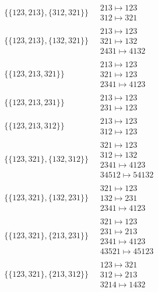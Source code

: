 \begin{scriptsize}
\begin{align}
\{\{123, 213\}, \{312, 321\}\}
\ 
&
\begin{matrix}
213 \mapsto 123\\312 \mapsto 321
\end{matrix}
\\
\{\{123, 213\}, \{132, 321\}\}
\ 
&
\begin{matrix}
213 \mapsto 123\\321 \mapsto 132\\2431 \mapsto 4132
\end{matrix}
\\
\{\{123, 213, 321\}\}
\ 
&
\begin{matrix}
213 \mapsto 123\\321 \mapsto 123\\2341 \mapsto 4123
\end{matrix}
\\
\{\{123, 213, 231\}\}
\ 
&
\begin{matrix}
213 \mapsto 123\\231 \mapsto 123
\end{matrix}
\\
\{\{123, 213, 312\}\}
\ 
&
\begin{matrix}
213 \mapsto 123\\312 \mapsto 123
\end{matrix}
\\
\{\{123, 321\}, \{132, 312\}\}
\ 
&
\begin{matrix}
321 \mapsto 123\\312 \mapsto 132\\2341 \mapsto 4123\\34512 \mapsto 54132
\end{matrix}
\\
\{\{123, 321\}, \{132, 231\}\}
\ 
&
\begin{matrix}
321 \mapsto 123\\132 \mapsto 231\\2341 \mapsto 4123
\end{matrix}
\\
\{\{123, 321\}, \{213, 231\}\}
\ 
&
\begin{matrix}
321 \mapsto 123\\231 \mapsto 213\\2341 \mapsto 4123\\43521 \mapsto 45123
\end{matrix}
\\
\{\{123, 321\}, \{213, 312\}\}
\ 
&
\begin{matrix}
123 \mapsto 321\\312 \mapsto 213\\3214 \mapsto 1432

\end{matrix}
\end{align}
\end{scriptsize}
